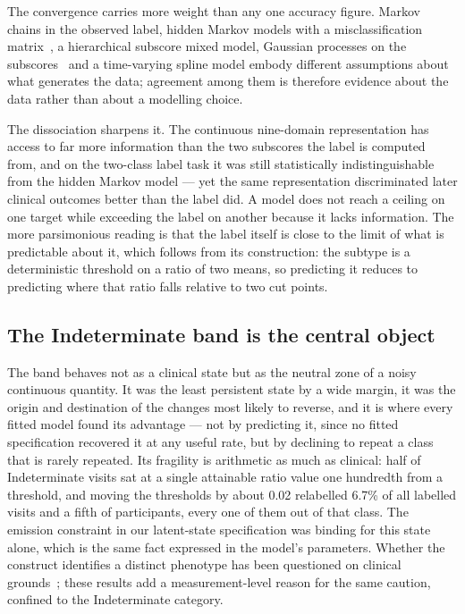 \documentclass[journal]{IEEEtran}
\begin{document}
The convergence carries more weight than any one accuracy figure. Markov chains
in the observed label, hidden Markov models with a misclassification
matrix~\cite{jackson2011}, a hierarchical subscore mixed model, Gaussian
processes on the subscores~\cite{rasmussen2006} and a time-varying spline model
embody different assumptions about what generates the data; agreement among them
is therefore evidence about the data rather than about a modelling choice.

The dissociation sharpens it. The continuous nine-domain representation has
access to far more information than the two subscores the label is computed
from, and on the two-class label task it was still statistically
indistinguishable from the hidden Markov model --- yet the same representation
discriminated later clinical outcomes better than the label did. A model does
not reach a ceiling on one target while exceeding the label on another because
it lacks information. The more parsimonious reading is that the label itself is
close to the limit of what is predictable about it, which follows from its
construction: the subtype is a deterministic threshold on a ratio of two means,
so predicting it reduces to predicting where that ratio falls relative to two
cut points.

\subsection{The Indeterminate band is the central object}
The band behaves not as a clinical state but as the neutral zone of a noisy
continuous quantity. It was the least persistent state by a wide margin, it was
the origin and destination of the changes most likely to reverse, and it is
where every fitted model found its advantage --- not by predicting it, since no
fitted specification recovered it at any useful rate, but by declining to repeat
a class that is rarely repeated. Its fragility is arithmetic as much as
clinical: half of Indeterminate visits sat at a single attainable ratio value one
hundredth from a threshold, and moving the thresholds by about 0.02 relabelled
6.7\% of all labelled visits and a fifth of participants, every one of them out
of that class. The emission constraint in our latent-state specification was
binding for this state alone, which is the same fact expressed in the model's
parameters. Whether the construct identifies a distinct phenotype has been
questioned on clinical grounds~\cite{nutt2016,urso2022}; these results add a
measurement-level reason for the same caution, confined to the Indeterminate
category.
\end{document}
